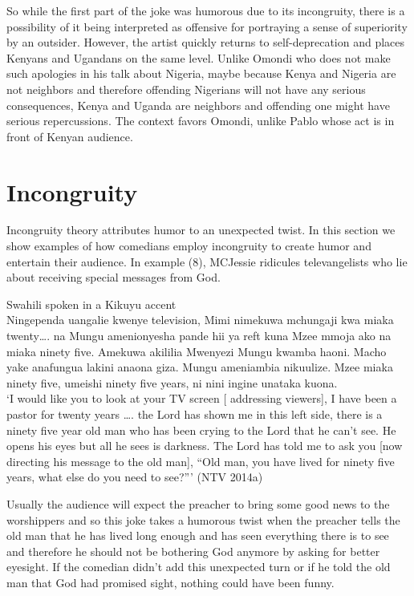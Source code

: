\documentclass[output=paper]{langsci/langscibook}
\begin{document}
 So while the first part of the joke was humorous due to its incongruity, there is a possibility of it being interpreted as offensive for portraying a sense of superiority by an outsider. However, the artist quickly returns to self-deprecation and places Kenyans and Ugandans on the same level. Unlike Omondi who does not make such apologies in his talk about Nigeria, maybe because Kenya and Nigeria are not neighbors and therefore offending Nigerians will not have any serious consequences, Kenya and Uganda are neighbors and offending one might have serious repercussions. The context favors Omondi, unlike Pablo whose act is in front of Kenyan audience.

\section{Incongruity}

   Incongruity theory attributes humor to an unexpected twist. In this section we show examples of how comedians employ incongruity to create humor and entertain their audience. In example (8), MCJessie ridicules televangelists who lie about receiving special messages from God.

\ea
Swahili spoken in a Kikuyu accent\\ 
Ningependa uangalie kwenye television, Mimi nimekuwa mchungaji kwa miaka twenty…. na Mungu amenionyesha pande hii ya reft kuna Mzee mmoja ako na miaka ninety five. Amekuwa akililia Mwenyezi Mungu kwamba haoni. Macho yake anafungua lakini anaona giza. Mungu ameniambia nikuulize. Mzee miaka ninety five, umeishi ninety five years, ni nini ingine unataka kuona.\\
\glt ‘I would like you to look at your TV screen [ addressing viewers], I have been a pastor for twenty years …. the Lord has shown me in this left side, there is a ninety five year old man who has been crying to the Lord that he can’t see. He opens his eyes but all he sees is darkness. The Lord has told me to ask you [now directing his message to the old man], “Old man, you have lived for ninety five years, what else do you need to see?”’  (NTV 2014a)
\z

Usually the audience will expect the preacher to bring some good news to the worshippers and so this joke takes a humorous twist when the preacher tells the old man that he has lived long enough and has seen everything there is to see and therefore he should not be bothering God anymore by asking for better eyesight. If the comedian didn’t add this unexpected turn or if he told the old man that God had promised sight, nothing could have been funny. 
\end{document}
